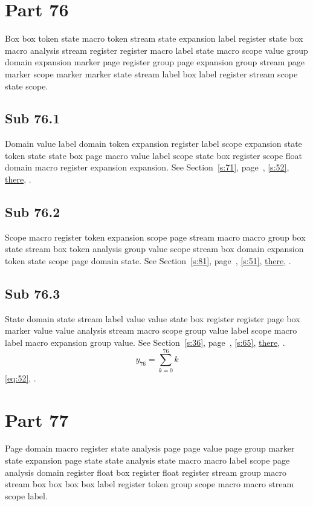 \documentclass[11pt]{article}
\begin{document}
\section{Part 76}\label{s:76}
Box box token state macro token stream state expansion label register state box macro analysis stream register register macro label state macro scope value group domain expansion marker page register group page expansion group stream page marker scope marker marker state stream label box label register stream scope state scope.
\subsection{Sub 76.1}\label{ss:76.1} Domain value label domain token expansion register label scope expansion state token state state box page macro value label scope state box register scope float domain macro register expansion expansion. See Section~\ref{s:71}, page~\pageref{ss:9.3}, \cref{s:52}, \hyperref[s:100]{there}, \cite{k99,k100}.
\subsection{Sub 76.2}\label{ss:76.2} Scope macro register token expansion scope page stream macro macro group box state stream box token analysis group value scope stream box domain expansion token state scope page domain state. See Section~\ref{s:81}, page~\pageref{ss:35.2}, \cref{s:51}, \hyperref[s:47]{there}, \cite{k53,k108}.
\subsection{Sub 76.3}\label{ss:76.3} State domain state stream label value value state box register register page box marker value value analysis stream macro scope group value label scope macro label macro expansion group value. See Section~\ref{s:36}, page~\pageref{ss:100.1}, \cref{s:65}, \hyperref[s:30]{there}, \cite{k29,k26}.
\begin{equation}y_{76}=\sum_{k=0}^{76}k\label{eq:76}\end{equation} \eqref{eq:52}, .
\section{Part 77}\label{s:77}
Page domain macro register state analysis page page value page group marker state expansion page state state analysis state macro macro label scope page analysis domain register float box register float register stream group macro stream box box box box label register token group scope macro macro stream scope label.
\end{document}
